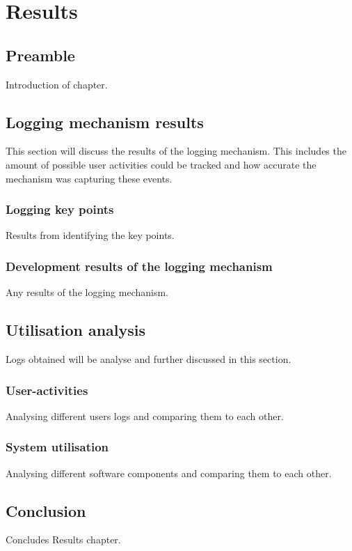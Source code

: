 \chapter{Results}
\label{chap:3}

\section{Preamble}
Introduction of chapter.

\section{Logging mechanism results}
This section will discuss the results of the logging mechanism. This includes the amount of possible user activities could be tracked and how accurate the mechanism was capturing these events.

\subsection{Logging key points}
Results from identifying the key points.

\subsection{Development results of the logging mechanism}
Any results of the logging mechanism.

\section{Utilisation analysis}
Logs obtained will be analyse and further discussed in this section.

\subsection{User-activities}
Analysing different users logs and comparing them to each other.

\subsection{System utilisation}
Analysing different software components and comparing them to each other.

\section{Conclusion}
Concludes Results chapter.